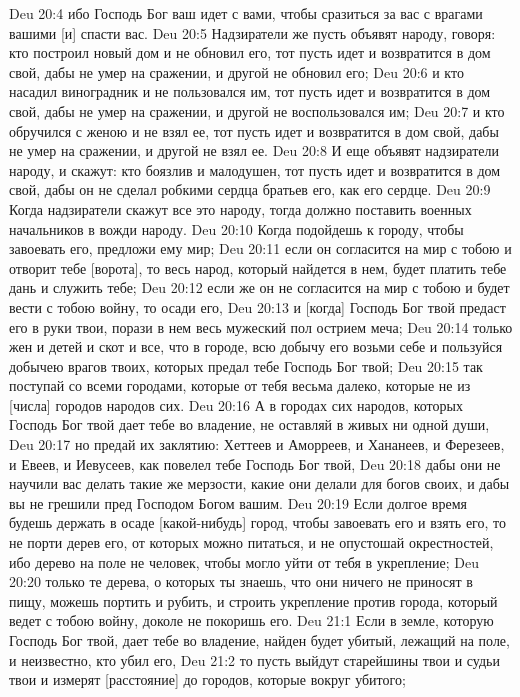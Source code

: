 Deu 20:4  ибо Господь Бог ваш идет с вами, чтобы сразиться за вас с врагами вашими [и] спасти вас.
Deu 20:5  Надзиратели же пусть объявят народу, говоря: кто построил новый дом и не обновил его, тот пусть идет и возвратится в дом свой, дабы не умер на сражении, и другой не обновил его;
Deu 20:6  и кто насадил виноградник и не пользовался им, тот пусть идет и возвратится в дом свой, дабы не умер на сражении, и другой не воспользовался им;
Deu 20:7  и кто обручился с женою и не взял ее, тот пусть идет и возвратится в дом свой, дабы не умер на сражении, и другой не взял ее.
Deu 20:8  И еще объявят надзиратели народу, и скажут: кто боязлив и малодушен, тот пусть идет и возвратится в дом свой, дабы он не сделал робкими сердца братьев его, как его сердце.
Deu 20:9  Когда надзиратели скажут все это народу, тогда должно поставить военных начальников в вожди народу.
Deu 20:10  Когда подойдешь к городу, чтобы завоевать его, предложи ему мир;
Deu 20:11  если он согласится на мир с тобою и отворит тебе [ворота], то весь народ, который найдется в нем, будет платить тебе дань и служить тебе;
Deu 20:12  если же он не согласится на мир с тобою и будет вести с тобою войну, то осади его,
Deu 20:13  и [когда] Господь Бог твой предаст его в руки твои, порази в нем весь мужеский пол острием меча;
Deu 20:14  только жен и детей и скот и все, что в городе, всю добычу его возьми себе и пользуйся добычею врагов твоих, которых предал тебе Господь Бог твой;
Deu 20:15  так поступай со всеми городами, которые от тебя весьма далеко, которые не из [числа] городов народов сих.
Deu 20:16  А в городах сих народов, которых Господь Бог твой дает тебе во владение, не оставляй в живых ни одной души,
Deu 20:17  но предай их заклятию: Хеттеев и Аморреев, и Хананеев, и Ферезеев, и Евеев, и Иевусеев, как повелел тебе Господь Бог твой,
Deu 20:18  дабы они не научили вас делать такие же мерзости, какие они делали для богов своих, и дабы вы не грешили пред Господом Богом вашим.
Deu 20:19  Если долгое время будешь держать в осаде [какой-нибудь] город, чтобы завоевать его и взять его, то не порти дерев его, от которых можно питаться, и не опустошай окрестностей, ибо дерево на поле не человек, чтобы могло уйти от тебя в укрепление;
Deu 20:20  только те дерева, о которых ты знаешь, что они ничего не приносят в пищу, можешь портить и рубить, и строить укрепление против города, который ведет с тобою войну, доколе не покоришь его.
Deu 21:1  Если в земле, которую Господь Бог твой, дает тебе во владение, найден будет убитый, лежащий на поле, и неизвестно, кто убил его,
Deu 21:2  то пусть выйдут старейшины твои и судьи твои и измерят [расстояние] до городов, которые вокруг убитого;
